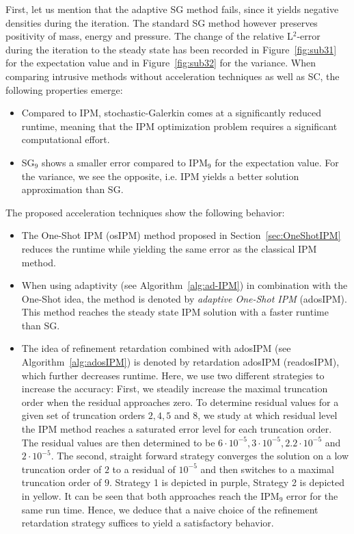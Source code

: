 First, let us mention that the adaptive SG method fails, since it yields negative densities during the iteration. The standard SG method however preserves positivity of mass, energy and pressure. The change of the relative L$^2$-error during the iteration to the steady state has been recorded in Figure~\ref{fig:sub31} for the expectation value and in Figure~\ref{fig:sub32} for the variance. When comparing intrusive methods without acceleration techniques as well as SC, the following properties emerge:
\begin{itemize}
\item Compared to IPM, stochastic-Galerkin comes at a significantly reduced runtime, meaning that the IPM optimization problem requires a significant computational effort.
\item SG$_9$ shows a smaller error compared to IPM$_9$ for the expectation value. For the variance, we see the opposite, i.e. IPM yields a better solution approximation than SG.
\end{itemize}
The proposed acceleration techniques show the following behavior:
\begin{itemize}
\item The One-Shot IPM (osIPM) method proposed in Section~\ref{sec:OneShotIPM} reduces the runtime while yielding the same error as the classical IPM method.
\item When using adaptivity (see Algorithm~\ref{alg:ad-IPM}) in combination with the One-Shot idea, the method is denoted by \textit{adaptive One-Shot IPM} (adosIPM). This method reaches the steady state IPM solution with a faster runtime than SG.
\item The idea of refinement retardation combined with adosIPM (see Algorithm~\ref{alg:adosIPM}) is denoted by retardation adosIPM (readosIPM), which further decreases runtime. Here, we use two different strategies to increase the accuracy: First, we steadily increase the maximal truncation order when the residual approaches zero. To determine residual values for a given set of truncation orders $2,4,5$ and $8$, we study at which residual level the IPM method reaches a saturated error level for each truncation order. The residual values are then determined to be $6\cdot 10^{-5},3\cdot 10^{-5},2.2\cdot 10^{-5}$ and $2\cdot 10^{-5}$. The second, straight forward strategy converges the solution on a low truncation order of $2$ to a residual of $10^{-5}$ and then switches to a maximal truncation order of $9$. Strategy 1 is depicted in purple, Strategy 2 is depicted in yellow. It can be seen that both approaches reach the IPM$_9$ error for the same run time. Hence, we deduce that a naive choice of the refinement retardation strategy suffices to yield a satisfactory behavior.
\end{itemize}

